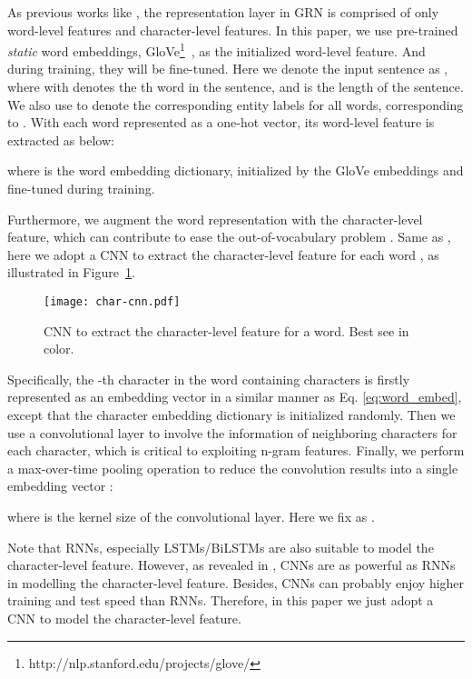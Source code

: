 \documentclass[letterpaper]{article} \usepackage{aaai19}  \usepackage{times}  \usepackage{helvet}  \usepackage{courier}  \usepackage{url}  \usepackage{graphicx}  \usepackage{amsmath}
\newcommand{\ie}{\text{i.e.,}}
\newcommand{\GRN}{GRN}
\begin{document}
As previous works like \cite{Ye2018HSCRF}, the representation layer in \GRN{} is comprised of only word-level features and character-level features. In this paper, we use pre-trained \textit{static} word embeddings, \ie{} GloVe\footnote{http://nlp.stanford.edu/projects/glove/}~\cite{pennington2014glove}, as the initialized word-level feature. And during training, they will be fine-tuned. Here we denote the input sentence  as , where  with  denotes the th word in the sentence, and  is the length of the sentence. We also use  to denote the corresponding entity labels for all words, \ie{}  corresponding to . With each word  represented as a one-hot vector, its word-level feature  is extracted as below:

where  is the word embedding dictionary, initialized by the GloVe embeddings and fine-tuned during training.

Furthermore, we augment the word representation with the character-level feature, which can contribute to ease the out-of-vocabulary problem \cite{rei2016attending}. Same as \cite{ma2016CNNBLSTMCRF}, here we adopt a CNN to extract the character-level feature for each word , as illustrated in Figure~\ref{fig:char-cnn}.

\begin{figure}[!t] \centering
  \texttt{[image: char-cnn.pdf]}
  \caption{CNN to extract the character-level feature for a word. Best see in color.}
  \label{fig:char-cnn}
\end{figure}

Specifically, the -th character in the word  containing  characters is firstly represented as an embedding vector  in a similar manner as Eq. \ref{eq:word_embed}, except that the character embedding dictionary is initialized randomly. Then we use a convolutional layer to involve the information of neighboring characters for each character, which is critical to exploiting n-gram features. Finally, we perform a max-over-time pooling operation to reduce the convolution results into a single embedding vector :

where  is the kernel size of the convolutional layer. Here we fix  as \cite{Ye2018HSCRF}.

Note that RNNs, especially LSTMs/BiLSTMs are also suitable to model the character-level feature. However, as revealed in \cite{yang2018design}, CNNs are as powerful as RNNs in modelling the character-level feature. Besides, CNNs can probably enjoy higher training and test speed than RNNs. Therefore, in this paper we just adopt a CNN to model the character-level feature.
\end{document}
